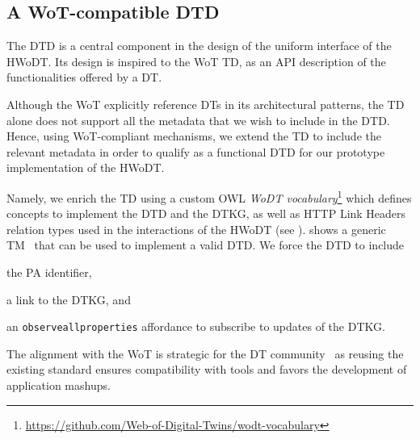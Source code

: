\subsection{A \acs{WoT}-compatible \acl{DTD}}

The \ac{DTD} is a central component in the design of the uniform interface of the \ac{HWoDT}.
%
Its design is inspired to the \ac{WoT} \ac{TD}, as an \ac{API} description of the functionalities offered by a \ac{DT}.

Although the \ac{WoT} explicitly reference \acp{DT} in its architectural patterns, the \ac{TD} alone does not support all the metadata that we wish to include in the \ac{DTD}.
Hence, using \ac{WoT}-compliant mechanisms, we extend the \ac{TD} to include the relevant metadata in order to qualify as a functional \ac{DTD} for our prototype implementation of the \ac{HWoDT}.

Namely, we enrich the \ac{TD} using a custom \acl{OWL} \emph{\ac{WoDT} vocabulary}\footnote{\url{https://github.com/Web-of-Digital-Twins/wodt-vocabulary}}
which defines concepts to implement the \ac{DTD} and the \ac{DTKG}, as well as HTTP Link Headers relation types used in the interactions of the \ac{HWoDT} (see ).
%
 shows a generic \ac{TM}~\cite{wotthing} that can be used to implement a valid \ac{DTD}. We force the \ac{DTD} to include \begin{inlinelist}
    \item the \ac{PA} identifier, 
    \item a link to the \ac{DTKG}, and
    \item an \texttt{observeallproperties} affordance to subscribe to updates of the \ac{DTKG}.
\end{inlinelist} 



The alignment with the \ac{WoT} is strategic for the \ac{DT} community~\cite{etsi2024tr103845,laurinaho2020datalink} as reusing the existing standard ensures compatibility with tools and favors the development of application mashups.



